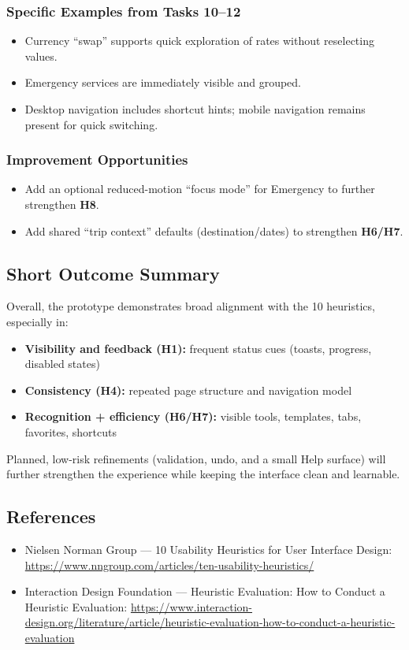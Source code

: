 \documentclass[11pt,a4paper]{article}
\begin{document}
\subsubsection{Specific Examples from Tasks 10--12}
\begin{itemize}
    \item Currency ``swap'' supports quick exploration of rates without reselecting values.
    \item Emergency services are immediately visible and grouped.
    \item Desktop navigation includes shortcut hints; mobile navigation remains present for quick switching.
\end{itemize}

\subsubsection{Improvement Opportunities}
\begin{itemize}
    \item Add an optional reduced-motion ``focus mode'' for Emergency to further strengthen \textbf{H8}.
    \item Add shared ``trip context'' defaults (destination/dates) to strengthen \textbf{H6/H7}.
\end{itemize}

\subsection{Short Outcome Summary}
Overall, the prototype demonstrates broad alignment with the 10 heuristics, especially in:

\begin{itemize}
    \item \textbf{Visibility and feedback (H1):} frequent status cues (toasts, progress, disabled states)
    \item \textbf{Consistency (H4):} repeated page structure and navigation model
    \item \textbf{Recognition + efficiency (H6/H7):} visible tools, templates, tabs, favorites, shortcuts
\end{itemize}

Planned, low-risk refinements (validation, undo, and a small Help surface) will further strengthen the experience while keeping the interface clean and learnable.

\subsection{References}
\begin{itemize}
    \item Nielsen Norman Group — 10 Usability Heuristics for User Interface Design: \url{https://www.nngroup.com/articles/ten-usability-heuristics/}
    \item Interaction Design Foundation — Heuristic Evaluation: How to Conduct a Heuristic Evaluation: \url{https://www.interaction-design.org/literature/article/heuristic-evaluation-how-to-conduct-a-heuristic-evaluation}
\end{itemize}
\end{document}
